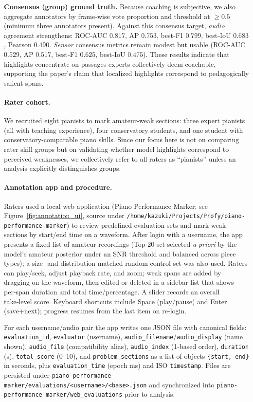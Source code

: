 \documentclass[sigconf,review,anonymous]{acmart}
\begin{document}
\textbf{Consensus (group) ground truth.} Because coaching is subjective, we also aggregate annotators by frame‑wise vote proportion and threshold at $\geq0.5$ (minimum three annotators present). Against this consensus target, \emph{audio} agreement strengthens: ROC‑AUC $0.817$, AP $0.753$, best‑F1 $0.799$, best‑IoU $0.683$, Pearson $0.490$. \emph{Sensor} consensus metrics remain modest but usable (ROC‑AUC $0.529$, AP $0.517$, best‑F1 $0.625$, best‑IoU $0.475$). These results indicate that highlights concentrate on passages experts collectively deem coachable, supporting the paper's claim that localized highlights correspond to pedagogically salient spans.

\paragraph{Rater cohort.}
We recruited eight pianists to mark amateur-weak sections: three expert pianists (all with teaching experience), four conservatory students, and one student with conservatory-comparable piano skills. Since our focus here is not on comparing rater skill groups but on validating whether model highlights correspond to perceived weaknesses, we collectively refer to all raters as “pianists” unless an analysis explicitly distinguishes groups.

\paragraph{Annotation app and procedure.}
Raters used a local web application (Piano Performance Marker; see Figure~\ref{fig:annotation_ui}, source under \verb|/home/kazuki/Projects/Profy/piano-performance-marker|) to review predefined evaluation sets and mark weak sections by start/end time on a waveform. After login with a username, the app presents a fixed list of amateur recordings (Top‑20 set selected \emph{a priori} by the model’s amateur posterior under an SNR threshold and balanced across piece types); a size‑ and distribution‑matched random control set was also used. Raters can play/seek, adjust playback rate, and zoom; weak spans are added by dragging on the waveform, then edited or deleted in a sidebar list that shows per‑span duration and total time/percentage. A slider records an overall take‑level score. Keyboard shortcuts include Space (play/pause) and Enter (save+next); progress resumes from the last item on re‑login.

For each username/audio pair the app writes one JSON file with canonical fields: \verb|evaluation_id|, \verb|evaluator| (username), \verb|audio_filename|/\verb|audio_display| (name shown), \verb|audio_file| (compatibility alias), \verb|audio_index| (1‑based order), \verb|duration| (s), \verb|total_score| (0–10), and \verb|problem_sections| as a list of objects \verb|{start, end}| in seconds, plus \verb|evaluation_time| (epoch ms) and ISO \verb|timestamp|. Files are persisted under \verb|piano-performance-marker/evaluations/<username>/<base>.json| and synchronized into \verb|piano-performance-marker/web_evaluations| prior to analysis.
\end{document}
